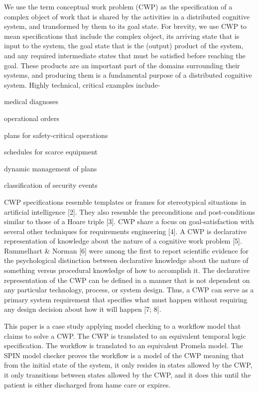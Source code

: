 We use the term conceptual work problem (CWP) as the specification of a complex object of work that is shared by the activities in a distributed cognitive system, and transformed by them to its goal state. For brevity, we use CWP to mean specifications that include the complex object, its arriving state that is input to the system, the goal state that is the (output) product of the system, and any required intermediate states that must be satisfied before reaching the goal. These products are an important part of the domains surrounding their systems, and producing them is a fundamental purpose of a distributed cognitive system. Highly technical, critical examples include- 
\begin{compactitem}
\item medical diagnoses 
\item operational orders
\item plans for safety-critical operations 
\item schedules for scarce equipment
\item dynamic management of plans
\item classification of security events
\end{compactitem}
CWP specifications resemble templates or frames for stereotypical situations in artificial intelligence [2]. They also resemble the preconditions and post-conditions similar to those of a Hoare triple [3]. CWP share a focus on goal-satisfaction with several other techniques for requirements engineering [4]. 
A CWP is declarative representation of knowledge about the nature of a cognitive work problem [5]. Rummelhart & Norman [6] were among the first to report scientific evidence for the psychological distinction between declarative knowledge about the nature of something versus procedural knowledge of how to accomplish it. The declarative representation of the CWP can be defined in a manner that is not dependent on any particular technology, process, or system design. Thus, a CWP can serve as a primary system requirement that specifies what must happen without requiring any design decision about how it will happen [7; 8].

This paper is a case study applying model checking to a workflow model that claims to solve a CWP. The CWP is translated to an equivalent temporal logic specification. The workflow is translated to an equivalent Promela model. The SPIN model checker proves the workflow is a model of the CWP meaning that from the initial state of the system, it only resides in states allowed by the CWP, it only transitions between states allowed by the CWP, and it does this until the patient is either discharged from hame care or expires.


